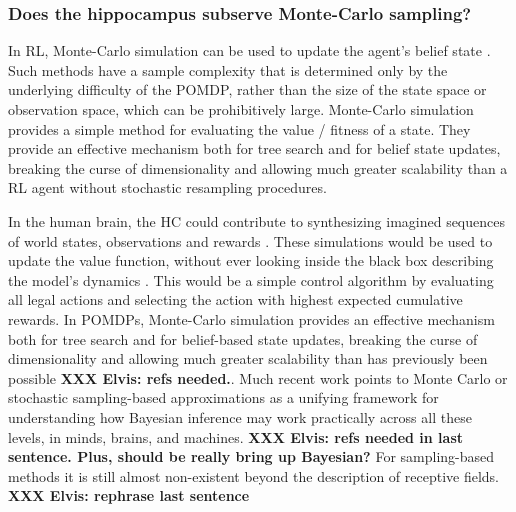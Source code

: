 \documentclass[10pt,letterpaper]{article}
\begin{document}

\subsubsection{Does the hippocampus subserve Monte-Carlo sampling?}
In RL, Monte-Carlo simulation can be used to update the agent's belief state
\citep{silver2010monte}. Such methods have a sample complexity that is determined only by the underlying difficulty of the POMDP, rather than the size of the state space or observation space,
which can be prohibitively large.
Monte-Carlo simulation provides a simple method for evaluating the value / fitness of a state.
They provide an effective mechanism both for tree search and for belief state updates, breaking the curse of dimensionality and allowing much greater scalability than a RL agent without stochastic resampling procedures.

In the human brain,
the HC could contribute to synthesizing imagined sequences of world states,
observations and rewards \citep{aronov2017, chao2017interaction}.
These simulations would be used to update the value function, without ever looking inside the black box describing the model's dynamics \citep{lavilleon2015}.
This would be a simple control algorithm by evaluating all legal actions and selecting the action with
highest expected cumulative rewards.
In POMDPs, Monte-Carlo simulation provides an effective mechanism both for tree search and for belief-based state updates, breaking the curse of dimensionality and allowing much greater scalability than has previously been possible
\textbf{XXX Elvis: refs needed.}.
Much recent work points to Monte Carlo or stochastic sampling-based approximations as a unifying framework for understanding how Bayesian inference may work practically across all these levels, in minds, brains, and machines. \textbf{XXX Elvis: refs needed in last sentence. Plus, should be really bring up Bayesian?} For sampling-based methods it is still almost non-existent beyond the description of receptive fields. \textbf{XXX Elvis: rephrase last sentence}
\end{document}
